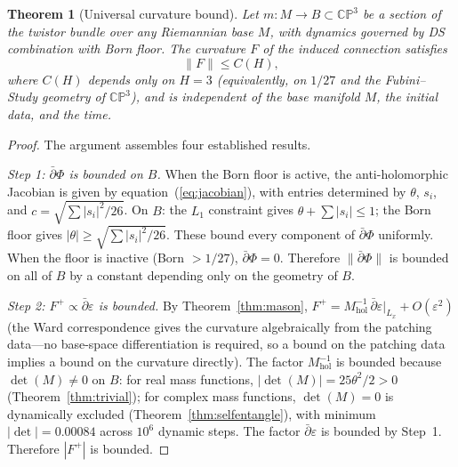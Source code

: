 \documentclass[11pt,a4paper]{article}
\newtheorem{theorem}{Theorem}[section]
\theoremstyle{definition}
\theoremstyle{remark}
\newcommand{\CP}{\mathbb{CP}}
\newcommand{\dbar}{\bar{\partial}}
\begin{document}
\begin{theorem}[Universal curvature bound]\label{thm:curvature_bound}
Let $m:M\to B\subset\CP^3$ be a section of the twistor bundle over any Riemannian base $M$, with dynamics governed by DS combination with Born floor. The curvature $F$ of the induced connection satisfies
\begin{equation}\label{eq:curv_bound}
\|F\|\leq C(H),
\end{equation}
where $C(H)$ depends only on $H=3$ (equivalently, on $1/27$ and the Fubini--Study geometry of $\CP^3$), and is independent of the base manifold $M$, the initial data, and the time.
\end{theorem}

\begin{proof}
The argument assembles four established results.

\emph{Step 1: $\dbar\Phi$ is bounded on $B$.} When the Born floor is active, the anti-holomorphic Jacobian is given by equation~(\ref{eq:jacobian}), with entries determined by $\theta$, $s_i$, and $c=\sqrt{\sum|s_i|^2/26}$. On $B$: the $L_1$ constraint gives $\theta+\sum|s_i|\leq 1$; the Born floor gives $|\theta|\geq\sqrt{\sum|s_i|^2/26}$. These bound every component of $\dbar\Phi$ uniformly. When the floor is inactive (Born $>1/27$), $\dbar\Phi=0$. Therefore $\|\dbar\Phi\|$ is bounded on all of $B$ by a constant depending only on the geometry of $B$.

\emph{Step 2: $F^+\propto\dbar\varepsilon$ is bounded.} By Theorem~\ref{thm:mason}, $F^+=M_{\mathrm{hol}}^{-1}\,\dbar\varepsilon|_{L_x}+O(\varepsilon^2)$ (the Ward correspondence gives the curvature algebraically from the patching data---no base-space differentiation is required, so a bound on the patching data implies a bound on the curvature directly). The factor $M_{\mathrm{hol}}^{-1}$ is bounded because $\det(M)\neq 0$ on $B$: for real mass functions, $|\det(M)|=25\theta^2/2>0$ (Theorem~\ref{thm:trivial}); for complex mass functions, $\det(M)=0$ is dynamically excluded (Theorem~\ref{thm:selfentangle}), with minimum $|\det|=0.00084$ across $10^6$ dynamic steps. The factor $\dbar\varepsilon$ is bounded by Step~1. Therefore $|F^+|$ is bounded.


\end{proof}
\end{document}
